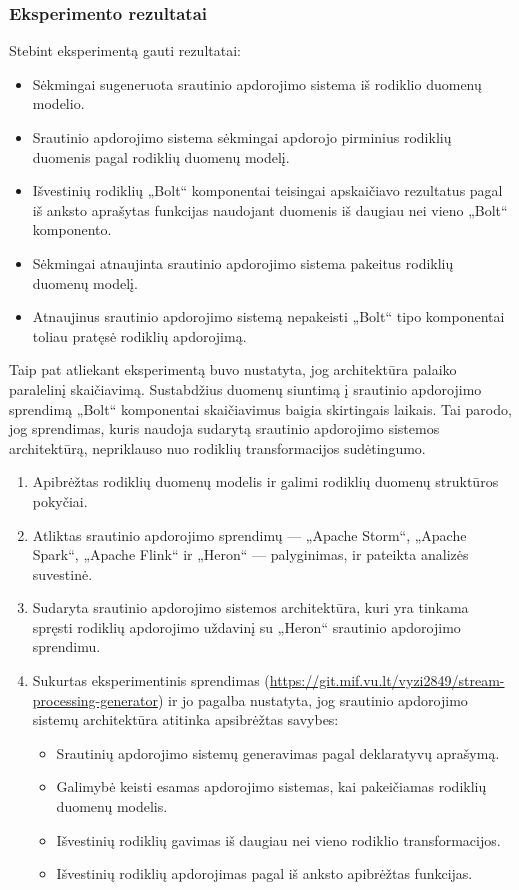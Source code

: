 \documentclass{VUMIFPSbakalaurinis}
\begin{document}
\subsubsection{Eksperimento rezultatai}
Stebint eksperimentą gauti rezultatai:
\begin{itemize}
    \item Sėkmingai sugeneruota srautinio apdorojimo sistema iš rodiklio duomenų modelio.
    \item Srautinio apdorojimo sistema sėkmingai apdorojo pirminius rodiklių duomenis pagal rodiklių duomenų modelį.
    \item Išvestinių rodiklių „Bolt“ komponentai teisingai apskaičiavo rezultatus pagal iš anksto aprašytas funkcijas naudojant duomenis iš daugiau nei vieno „Bolt“ komponento.
    \item Sėkmingai atnaujinta srautinio apdorojimo sistema pakeitus rodiklių duomenų modelį.
    \item Atnaujinus srautinio apdorojimo sistemą nepakeisti „Bolt“ tipo komponentai toliau pratęsė rodiklių apdorojimą. 
\end{itemize}
Taip pat atliekant eksperimentą buvo nustatyta, jog architektūra palaiko paralelinį skaičiavimą. Sustabdžius duomenų siuntimą į srautinio apdorojimo sprendimą „Bolt“ komponentai skaičiavimus baigia skirtingais laikais. Tai parodo, jog sprendimas, kuris naudoja sudarytą srautinio apdorojimo sistemos architektūrą, nepriklauso nuo rodiklių transformacijos sudėtingumo.


\begin{enumerate}
    \item Apibrėžtas rodiklių duomenų modelis ir galimi rodiklių duomenų struktūros pokyčiai.
    \item Atliktas srautinio apdorojimo sprendimų — „Apache Storm“, „Apache Spark“, „Apache Flink“ ir „Heron“ — palyginimas, ir pateikta analizės suvestinė. 
    \item Sudaryta srautinio apdorojimo sistemos architektūra, kuri yra tinkama spręsti rodiklių apdorojimo uždavinį su „Heron“ srautinio apdorojimo sprendimu. 
    \item Sukurtas eksperimentinis sprendimas (\url{https://git.mif.vu.lt/vyzi2849/stream-processing-generator}) ir jo pagalba nustatyta, jog srautinio apdorojimo sistemų architektūra atitinka apsibrėžtas savybes:
    \begin{itemize}
        \item Srautinių apdorojimo sistemų generavimas pagal deklaratyvų aprašymą.
        \item Galimybė keisti esamas apdorojimo sistemas, kai pakeičiamas rodiklių duomenų modelis.
        \item Išvestinių rodiklių gavimas iš daugiau nei vieno rodiklio transformacijos.
        \item Išvestinių rodiklių apdorojimas pagal iš anksto apibrėžtas funkcijas.
    \end{itemize}  
    
\end{enumerate}
\end{document}
